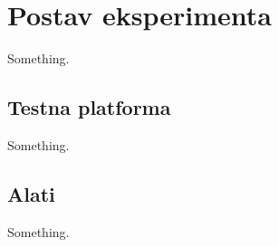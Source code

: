\chapter{Postav eksperimenta}
Something.

\section{Testna platforma}
Something.

\section{Alati}
Something.